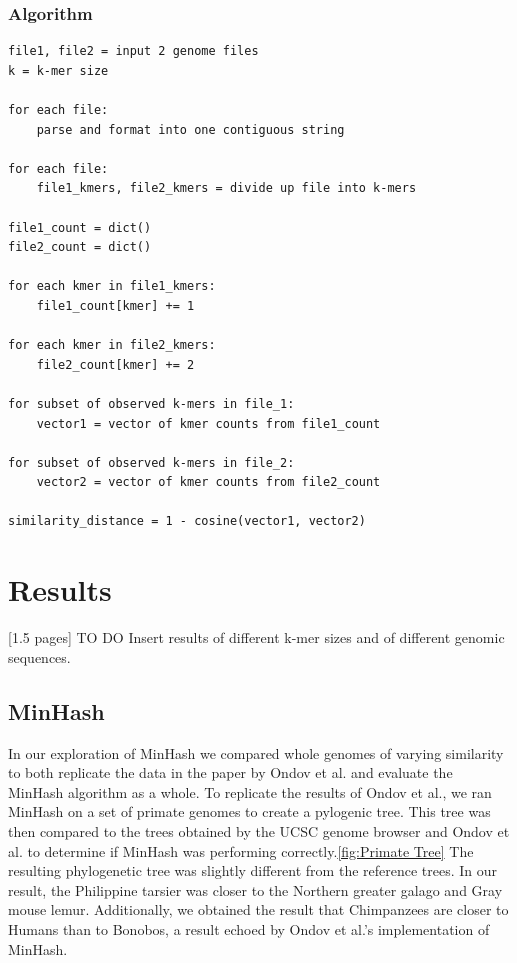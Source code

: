 \documentclass[12pt, letterpaper]{article}
\begin{document}
\subsubsection{Algorithm}
\begin{verbatim}
file1, file2 = input 2 genome files 
k = k-mer size

for each file:
    parse and format into one contiguous string

for each file:
    file1_kmers, file2_kmers = divide up file into k-mers

file1_count = dict()
file2_count = dict()

for each kmer in file1_kmers:
    file1_count[kmer] += 1

for each kmer in file2_kmers:
    file2_count[kmer] += 2

for subset of observed k-mers in file_1:
    vector1 = vector of kmer counts from file1_count

for subset of observed k-mers in file_2:
    vector2 = vector of kmer counts from file2_count

similarity_distance = 1 - cosine(vector1, vector2)
\end{verbatim}

\section{Results}
[1.5 pages] \color{red} TO DO \color{black} Insert results of different k-mer sizes and of different genomic sequences.


\subsection{MinHash}
In our exploration of MinHash we compared whole genomes of varying similarity to both replicate the data in the paper by Ondov et al. and evaluate the MinHash algorithm as a whole. To replicate the results of Ondov et al., we ran MinHash on a set of primate genomes to create a pylogenic tree. This tree was then compared to the trees obtained by the UCSC genome browser and Ondov et al. to determine if MinHash was performing correctly.\ref{fig:Primate Tree} The resulting phylogenetic tree was slightly different from the reference trees. In our result, the Philippine tarsier was closer to the Northern greater galago and Gray mouse lemur. Additionally, we obtained the result that Chimpanzees are closer to Humans than to Bonobos, a result echoed by Ondov et al.'s implementation of MinHash.
\end{document}
